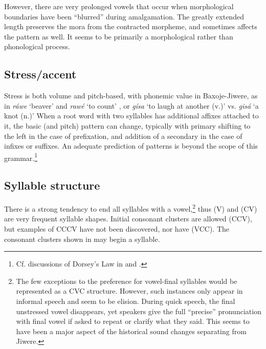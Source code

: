 \documentclass[output=paper]{LSP/langsci}
\begin{document}
However, there are very prolonged vowels that occur when morphological boundaries have been ``blurred'' during amalgamation.  The greatly extended length preserves the mora from the contracted morpheme, and sometimes affects the  pattern as well.  It seems to be primarily a morphological rather than phonological process.  

\subsection{Stress/accent} 
Stress is both volume and pitch-based, with phonemic value in Baxoje-Jiwere, as in \textit{ráwe} `beaver' and \textit{rawé} `to count' \citep{GoodtracksND}, or \textit{g\'isa} `to laugh at another (v.)' vs. \textit{gisá}  `a knot (n.)'  \citep{DorseyNDChiwere}   When a root word with two syllables has additional affixes attached to it, the basic  (and pitch) pattern can change, typically with primary  shifting to the left in the case of prefixation, and addition of a secondary  in the case of infixes or suffixes.  An adequate prediction of  patterns is beyond the scope of this grammar.\footnote{Cf. discussions of Dorsey's Law in \citet{Miner1979b} and \citet{HaleWhiteEagle1980}.} 

\subsection{Syllable structure} There is a strong tendency to end all syllables with a vowel,\footnote{The few exceptions to the preference for vowel-final syllables would be represented as a CVC structure. However, such instances only appear in informal speech and seem to be elision. During quick speech, the final unstressed vowel disappears, yet speakers give the full ``precise'' pronunciation with final vowel if asked to repeat or clarify what they said. This seems to have been a major aspect of the historical sound changes separating  from Jiwere.} thus (V) and (CV) are very frequent syllable shapes. Initial consonant clusters are allowed (CCV), but examples of CCCV have not been discovered, nor have (VCC).  The consonant clusters shown in  may begin a syllable. 
\end{document}
